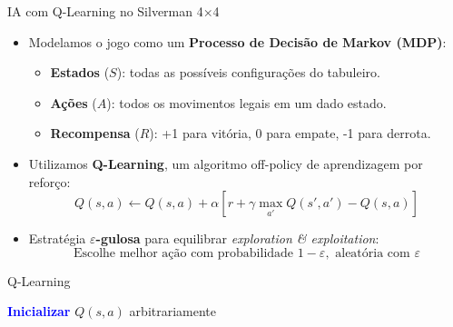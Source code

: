 \documentclass{beamer}
\begin{document}
\begin{frame}{IA com Q-Learning no Silverman 4×4}
\begin{itemize}
  \item Modelamos o jogo como um \textbf{Processo de Decisão de Markov (MDP)}:
  \begin{itemize}
    \item \textbf{Estados} (\( S \)): todas as possíveis configurações do tabuleiro.
    \item \textbf{Ações} (\( A \)): todos os movimentos legais em um dado estado.
    \item \textbf{Recompensa} (\( R \)): +1 para vitória, 0 para empate, -1 para derrota.
  \end{itemize}
  \item Utilizamos \textbf{Q-Learning}, um algoritmo off-policy de aprendizagem por reforço:
  \[
  Q(s,a) \leftarrow Q(s,a) + \alpha \left[ r + \gamma \max_{a'} Q(s',a') - Q(s,a) \right]
  \]
  \item Estratégia \textbf{$\varepsilon$-gulosa} para equilibrar \textit{exploration \& exploitation}:
  \[
  \text{Escolhe melhor ação com probabilidade } 1 - \varepsilon, \text{ aleatória com } \varepsilon
  \]
\end{itemize}
\end{frame}

\begin{frame}[fragile]{Q-Learning}
\begin{center}
\begin{minipage}{0.85\linewidth} %
\begin{algorithm}[H]
\DontPrintSemicolon
\textcolor{blue}{\textbf{Inicializar}} $Q(s, a)$ arbitrariamente\;
\end{algorithm}
\end{minipage}
\end{center}
\end{frame}
\end{document}
